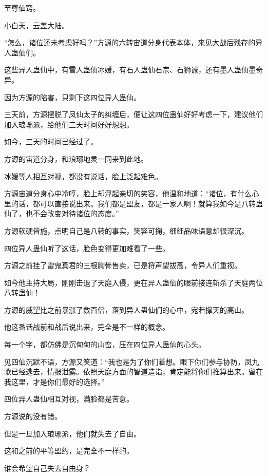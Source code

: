 
\begin{this_body}



至尊仙窍。

小白天，云盖大陆。

“怎么，诸位还未考虑好吗？”方源的六转宙道分身代表本体，来见大战后残存的异人蛊仙们。

这些异人蛊仙中，有雪人蛊仙冰媛，有石人蛊仙石宗、石狮诚，还有墨人蛊仙墨奇异。

因为方源的陷害，只剩下这四位异人蛊仙。

三天前，方源摆脱了凤仙太子的纠缠后，便让这四位蛊仙好好考虑一下，建议他们加入琅琊派，给他们三天时间好好想想。

如今，三天的时间已经过了。

方源的宙道分身，和琅琊地灵一同来到此地。

冰媛等人相互对视，都没有说话，脸上泛起难色。

方源宙道分身心中冷哼，脸上却浮起亲切的笑容，他温和地道：“诸位，有什么心里的话，都可以直接说出来。我们都是盟友，都是一家人啊！就算我如今是八转蛊仙了，也不会改变对待诸位的态度。”

方源软硬皆施，点明自己是八转的事实，笑容可掬，细细品味语意却很深沉。

四位异人蛊仙听了这话，脸色变得更加难看了一些。

方源之前挂了雷鬼真君的三根胸骨售卖，已是将声望拔高，令异人们重视。

如今他主持大局，刚刚击退了天庭入侵，更在异人蛊仙的眼前接连斩杀了天庭两位八转蛊仙！

方源的威望比之前暴涨了数百倍，落到异人蛊仙们的心中，宛若撑天的高山。

他这番话战前和战后说出来，完全是不一样的概念。

每一个字，都仿佛是沉甸甸的山峦，压在四位异人蛊仙的心头。

见四仙沉默不语，方源又笑道：“我也是为了你们着想。眼下你们参与协防，凤九歌已经逃去，情报泄露。依照天庭方面的智道造诣，肯定能将你们推算出来。留在我这里，才是你们最好的选择。”

四位异人蛊仙相互对视，满脸都是苦意。

方源说的没有错。

但是一旦加入琅琊派，他们就失去了自由。

这和之前的平等盟约，是完全不一样的。

谁会希望自己失去自由身？


\end{this_body}
